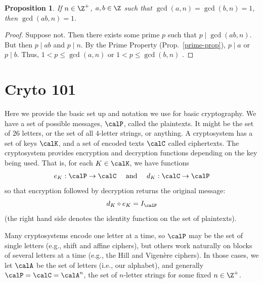 \documentclass[12pt]{amsart}
\theoremstyle{plain}
\newtheorem{prop}[thm]{Proposition}
\theoremstyle{definition}
\theoremstyle{remark}
\begin{document}
\begin{prop}
  If $n\in\Z^+$, $a,b\in\Z$ such that $\gcd(a,n)=\gcd(b,n)=1$, then
  $\gcd(ab,n)=1$.
\end{prop}
\begin{proof}
  Suppose not.  Then there exists some prime $p$ such that $p\mid
  \gcd(ab,n)$.  But then $p\mid ab$ and $p\mid n$.  By the Prime
  Property (Prop.~\ref{prime-prop}), $p\mid a$ or $p\mid b$.  Thus, $1<p\leq
  \gcd(a,n)$ or $1<p\leq \gcd(b,n)$ \con.
\end{proof}

\section{Cryto 101}
\label{crypto-101}
Here we provide the basic set up and notation we use for basic
cryptography.  We have a set of possible messages, $\calP$, called the
plaintexts.  It might be the set of $26$ letters, or the set of all
$4$-letter strings, or anything.  A cryptosystem has a set of keys
$\calK$, and a set of encoded  texts $\calC$ called ciphertexts.  The
cryptosystem provides encryption and decryption functions depending on
the key being used.  That is, for each $K\in\calK$, we have functions
\[ e_K:\calP\to \calC \quad \text{ and }\quad d_K:\calC\to \calP\]
so that encryption followed by decryption returns the original
message:
\[ d_K\circ e_K = I_{\calP}\]
(the right hand side denotes the identity function on the set of
plaintexts).

Many cryptosystems encode one letter at a time, so $\calP$ may be the
set of single letters (e.g., shift and affine ciphers), but others
work naturally on blocks of several letters at a time (e.g., the Hill
and Vigen\`ere ciphers).  In those cases, we let $\calA$ be the set of
letters (i.e., our alphabet), and generally $\calP=\calC=\calA^n$, the
set of $n$-letter strings for some fixed $n\in\Z^+$.
\end{document}
